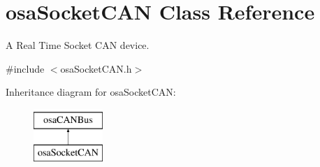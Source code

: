 \hypertarget{classosa_socket_c_a_n}{}\section{osa\+Socket\+C\+A\+N Class Reference}
\label{classosa_socket_c_a_n}


A Real Time Socket C\+A\+N device.  




{\ttfamily \#include $<$osa\+Socket\+C\+A\+N.\+h$>$}

Inheritance diagram for osa\+Socket\+C\+A\+N\+:\begin{figure}[H]
\begin{center}
\leavevmode
\includegraphics[height=2.000000cm]{de/d5a/classosa_socket_c_a_n}
\end{center}
\end{figure}
